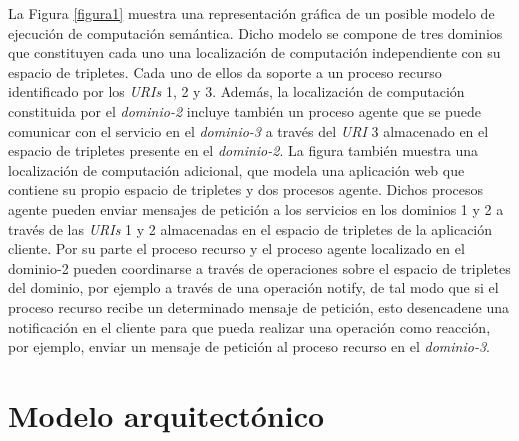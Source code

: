 La Figura \ref{figura1} muestra una representaci\'on gr\'afica de un posible modelo de ejecuci\'on de computaci\'on sem\'antica. Dicho modelo se compone de tres dominios que constituyen cada uno una localizaci\'on de computaci\'on independiente con su espacio de tripletes. Cada uno de ellos da soporte a un proceso recurso identificado por los \textit{URIs} 1, 2 y 3. Adem\'as, la localizaci\'on de computaci\'on constituida por el \textit{dominio-2} incluye tambi\'en un proceso agente que se puede comunicar con el servicio en el \textit{dominio-3} a trav\'es del \textit{URI} 3 almacenado en el espacio de tripletes presente en el \textit{dominio-2}. La figura tambi\'en muestra una localizaci\'on de computaci\'on adicional, que modela una aplicaci\'on web que contiene su propio espacio de tripletes y dos procesos agente. Dichos procesos agente pueden enviar mensajes de petici\'on a los servicios en los dominios 1 y 2 a trav\'es de las \textit{URIs} 1 y 2 almacenadas en el espacio de tripletes de la aplicaci\'on cliente. Por su parte el proceso recurso y el proceso agente localizado en el dominio-2 pueden coordinarse a trav\'es de operaciones sobre el espacio de tripletes del dominio,  por ejemplo a trav\'es de una operaci\'on notify, de tal modo que si el proceso recurso recibe un determinado mensaje de petici\'on, esto desencadene una notificaci\'on en el cliente para que pueda realizar una operaci\'on como reacci\'on, por ejemplo, enviar un mensaje de petici\'on al proceso recurso en el \textit{dominio-3}.

\section{Modelo arquitect\'onico}


